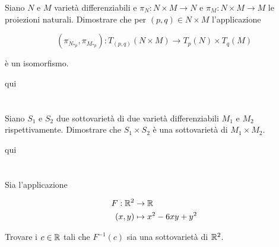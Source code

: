 \begin{tcolorbox}
	Siano $ N $ e $ M $ varietà differenziabili e $ \pi_{N} : N \times M \to N $ e $ \pi_{M} : N \times M \to M $ le proiezioni naturali. Dimostrare che per $ (p,q) \in N \times M $ l'applicazione
	
	\begin{equation}
		(\pi_{N_{*p}},\pi_{M_{*p}}) : T_{(p,q)}(N \times M) \to T_{p}(N) \times T_{q}(M)
	\end{equation}
	
	è un isomorfismo.
\end{tcolorbox}

qui




%

\newpage

%

\section{}\label{es2-12}

\begin{tcolorbox}
	Siano $ S_{1} $ e $ S_{2} $ due sottovarietà di due varietà differenziabili $ M_{1} $ e $ M_{2} $ rispettivamente. Dimostrare che $ S_{1} \times S_{2} $ è una sottovarietà di $ M_{1} \times M_{2} $.
\end{tcolorbox}

qui

%

\newpage

%

\section{}\label{es2-13}

\begin{tcolorbox}
	Sia l'applicazione
	
	\begin{align}
		\begin{split}
			F : \mathbb{R}^{2} &\to \mathbb{R}\\
			(x,y) &\mapsto x^{2}-6xy+y^{2}
		\end{split}
	\end{align}

	Trovare i $ c \in \mathbb{R} $ tali che $ F^{-1}(c) $ sia una sottovarietà di $ \mathbb{R}^{2} $.
\end{tcolorbox}

